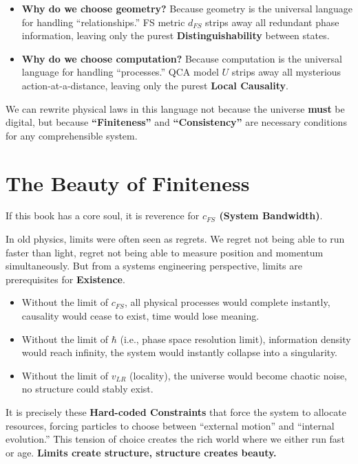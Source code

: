 \documentclass[11pt,a4paper,twoside]{book}
\begin{document}
\begin{itemize}
\item \textbf{Why do we choose geometry?} Because geometry is the universal language for handling ``relationships.'' FS metric $d_{FS}$ strips away all redundant phase information, leaving only the purest \textbf{Distinguishability} between states.

\item \textbf{Why do we choose computation?} Because computation is the universal language for handling ``processes.'' QCA model $U$ strips away all mysterious action-at-a-distance, leaving only the purest \textbf{Local Causality}.
\end{itemize}

We can rewrite physical laws in this language not because the universe \textbf{must} be digital, but because \textbf{``Finiteness''} and \textbf{``Consistency''} are necessary conditions for any comprehensible system.

\section{The Beauty of Finiteness}

If this book has a core soul, it is reverence for \textbf{$c_{FS}$ (System Bandwidth)}.

In old physics, limits were often seen as regrets. We regret not being able to run faster than light, regret not being able to measure position and momentum simultaneously. But from a systems engineering perspective, limits are prerequisites for \textbf{Existence}.

\begin{itemize}
\item Without the limit of $c_{FS}$, all physical processes would complete instantly, causality would cease to exist, time would lose meaning.

\item Without the limit of $\hbar$ (i.e., phase space resolution limit), information density would reach infinity, the system would instantly collapse into a singularity.

\item Without the limit of $v_{LR}$ (locality), the universe would become chaotic noise, no structure could stably exist.
\end{itemize}

It is precisely these \textbf{Hard-coded Constraints} that force the system to allocate resources, forcing particles to choose between ``external motion'' and ``internal evolution.'' This tension of choice creates the rich world where we either run fast or age. \textbf{Limits create structure, structure creates beauty.}
\end{document}
